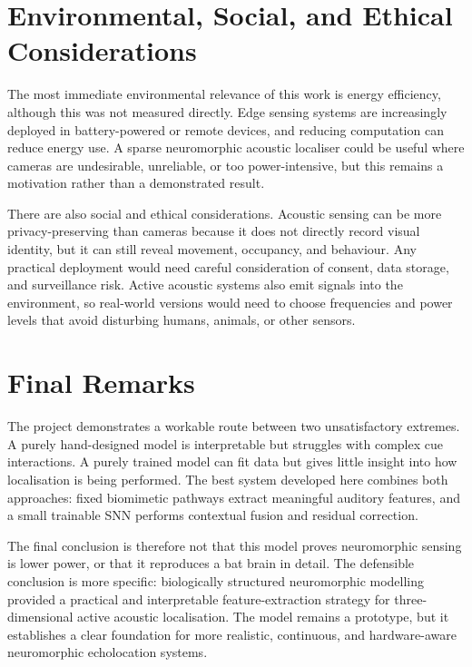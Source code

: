 \section{Environmental, Social, and Ethical Considerations}

The most immediate environmental relevance of this work is energy efficiency, although this was not measured directly. Edge sensing systems are increasingly deployed in battery-powered or remote devices, and reducing computation can reduce energy use. A sparse neuromorphic acoustic localiser could be useful where cameras are undesirable, unreliable, or too power-intensive, but this remains a motivation rather than a demonstrated result.

There are also social and ethical considerations. Acoustic sensing can be more privacy-preserving than cameras because it does not directly record visual identity, but it can still reveal movement, occupancy, and behaviour. Any practical deployment would need careful consideration of consent, data storage, and surveillance risk. Active acoustic systems also emit signals into the environment, so real-world versions would need to choose frequencies and power levels that avoid disturbing humans, animals, or other sensors.

\section{Final Remarks}

The project demonstrates a workable route between two unsatisfactory extremes. A purely hand-designed model is interpretable but struggles with complex cue interactions. A purely trained model can fit data but gives little insight into how localisation is being performed. The best system developed here combines both approaches: fixed biomimetic pathways extract meaningful auditory features, and a small trainable SNN performs contextual fusion and residual correction.

The final conclusion is therefore not that this model proves neuromorphic sensing is lower power, or that it reproduces a bat brain in detail. The defensible conclusion is more specific: biologically structured neuromorphic modelling provided a practical and interpretable feature-extraction strategy for three-dimensional active acoustic localisation. The model remains a prototype, but it establishes a clear foundation for more realistic, continuous, and hardware-aware neuromorphic echolocation systems.

